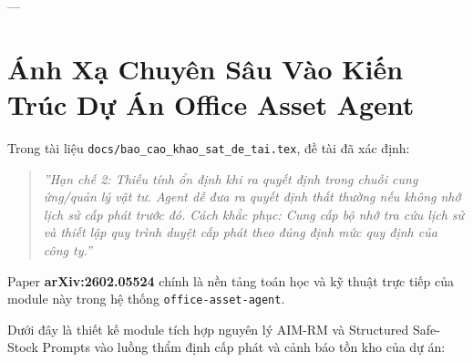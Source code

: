 \documentclass[11pt,a4paper]{article}
\begin{document}
---

\section{Ánh Xạ Chuyên Sâu Vào Kiến Trúc Dự Án Office Asset Agent}

\begin{deepdivebox}
Trong tài liệu \texttt{docs/bao\_cao\_khao\_sat\_de\_tai.tex}, đề tài đã xác định:
\begin{quote}
\textit{''Hạn chế 2: Thiếu tính ổn định khi ra quyết định trong chuỗi cung ứng/quản lý vật tư. Agent dễ đưa ra quyết định thất thường nếu không nhớ lịch sử cấp phát trước đó. Cách khắc phục: Cung cấp bộ nhớ tra cứu lịch sử và thiết lập quy trình duyệt cấp phát theo đúng định mức quy định của công ty.''}
\end{quote}
Paper \textbf{arXiv:2602.05524} chính là nền tảng toán học và kỹ thuật trực tiếp của module này trong hệ thống \texttt{office-asset-agent}.
\end{deepdivebox}

Dưới đây là thiết kế module tích hợp nguyên lý AIM-RM và Structured Safe-Stock Prompts vào luồng thẩm định cấp phát và cảnh báo tồn kho của dự án:
\end{document}
